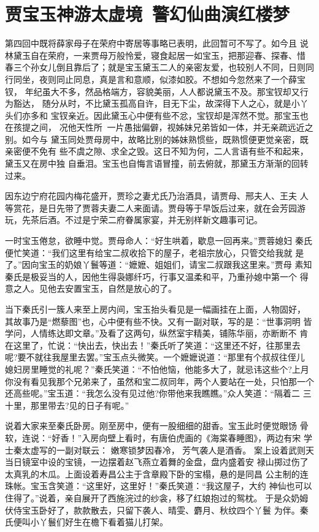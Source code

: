 \chapter{贾宝玉神游太虚境~警幻仙曲演红楼梦}

第四回中既将薛家母子在荣府中寄居等事略已表明，此回暂可不写了。如今且
说林黛玉自在荣府，一来贾母万般怜爱，寝食起居一如宝玉，把那迎春、探春、惜
春三个孙女儿倒且靠后了；就是宝玉黛玉二人的亲密友爱，也较别人不同，日则同
行同坐，夜则同止同息，真是言和意顺，似漆如胶。不想如今忽然来了一个薛宝钗，
年纪虽大不多，然品格端方，容貌美丽，人人都说黛玉不及。那宝钗却又行为豁达，
随分从时，不比黛玉孤高自许，目无下尘，故深得下人之心，就是小丫头们亦多和
宝钗亲近。因此黛玉心中便有些不忿，宝钗却是浑然不觉。那宝玉也在孩提之间，
况他天性所，一片愚拙偏僻，视姊妹兄弟皆如一体，并无亲疏远近之别。如今与
黛玉同处贾母房中，故略比别的姊妹熟惯些，既熟惯便更觉亲密，既亲密便不免有
些不虞之隙、求全之毁。这日不知为何，二人言语有些不和起来，黛玉又在房中独
自垂泪。宝玉也自悔言语冒撞，前去俯就，那黛玉方渐渐的回转过来。

因东边宁府花园内梅花盛开，贾珍之妻尤氏乃治酒具，请贾母、邢夫人、王夫
人等赏花，是日先带了贾蓉夫妻二人来面请。贾母等于早饭后过来，就在会芳园游
玩，先茶后酒。不过是宁荣二府眷属家宴，并无别样新文趣事可记。

一时宝玉倦怠，欲睡中觉。贾母命人：“好生哄着，歇息一回再来。”贾蓉媳妇
秦氏便忙笑道：“我们这里有给宝二叔收拾下的屋子，老祖宗放心，只管交给我就
是了。”因向宝玉的奶娘丫鬟等道：“嬷嬷、姐姐们，请宝二叔跟我这里来。”贾母
素知秦氏是极妥当的人，因他生得袅娜纤巧，行事又温柔和平，乃重孙媳中第一个
得意之人。见他去安置宝玉，自然是放心的了。

当下秦氏引一簇人来至上房内间，宝玉抬头看见是一幅画挂在上面，人物固好，
其故事乃是“燃藜图”也，心中便有些不快。又有一副对联，写的是：“世事洞明
皆学问，人情练达即文章。”及看了这两句，纵然室宇精美，铺陈华丽，亦断断不
肯在这里了，忙说：“快出去，快出去！”秦氏听了笑道：“这里还不好，往那里去
呢?要不就往我屋里去罢。”宝玉点头微笑。一个嬷嬷说道：“那里有个叔叔往侄儿
媳妇房里睡觉的礼呢？”秦氏笑道：“不怕他恼，他能多大了，就忌讳这些个?上月
你没有看见我那个兄弟来了，虽然和宝二叔同年，两个人要站在一处，只怕那一个
还高些呢。”宝玉道：“我怎么没有见过他?你带他来我瞧瞧。”众人笑道：“隔着二
三十里，那里带去?见的日子有呢。”

说着大家来至秦氏卧房。刚至房中，便有一股细细的甜香。宝玉此时便觉眼饧
骨软，连说：“好香！”入房向壁上看时，有唐伯虎画的《海棠春睡图》，两边有宋
学士秦太虚写的一副对联云：
嫩寒锁梦因春冷，
芳气袭人是酒香。
案上设着武则天当日镜室中设的宝镜，一边摆着赵飞燕立着舞的金盘，盘内盛着安
禄山掷过伤了太真乳的木瓜。上面设着寿昌公主于含章殿下卧的宝榻，悬的是同昌
公主制的连珠帐。宝玉含笑道：“这里好，这里好！”秦氏笑道：“我这屋子，大约
神仙也可以住得了。”说着，亲自展开了西施浣过的纱衾，移了红娘抱过的鸳枕。
于是众奶姆伏侍宝玉卧好了，款款散去，只留下袭人、晴雯、麝月、秋纹四个丫鬟
为伴。秦氏便叫小丫鬟们好生在檐下看着猫儿打架。

